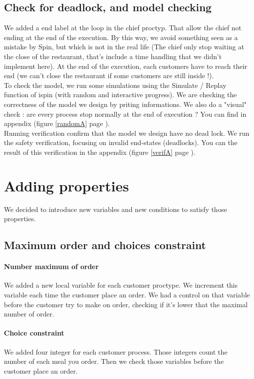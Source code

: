 \documentclass[a4paper,11pt]{article} %
\begin{document}
\subsection{Check for deadlock, and model checking}
We added a end label at the loop in the chief proctyp. That allow the chief not ending at the end of the execution. By this way, we avoid something seen as a mistake by Spin, but which is not in the real life (The chief only stop waiting at the close of the restaurant, that's include a time handling that we didn't implement here). At the end of the execution, each customers have to reach their end (we can't close the restaurant if some customers are still inside !).\\
To check the model, we run some simulations using the Simulate / Replay function of ispin (with random and interactive progress). We are checking the correctness of the model we design by priting informations. We also do a "visual" check : are every process stop normally at the end of execution ? You can find in appendix (figure \ref{randomA} page \pageref{randomA}).\\
Running verification confirm that the model we design have no dead lock. We run the safety verification, focusing on invalid end-states (deadlocks). You can the result of this verification in the appendix (figure \ref{verifA} page \pageref{verifA}).
\newpage
\section{Adding properties}
We decided to introduce new variables and new conditions to satisfy those properties.
\subsection{Maximum order and choices constraint}
\paragraph{Number maximum of order}
We added a new local variable for each customer proctype. We increment this variable each time the customer place an order. We had a control on that variable before the customer try to make on order, checking if it's lower that the maximal number of order.
\paragraph{Choice constraint}
We added four integer for each customer process. Those integers count the number of each meal you order. Then we check those variables before the customer place an order.
\end{document}
